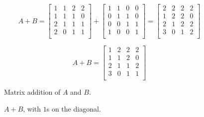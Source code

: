 \documentclass[../textbook.tex]{subfiles}
\begin{document}
\begin{figure}[h]
	\begin{center}
		\begin{minipage}[b]{0.55\textwidth}
			\centering
			$$A+B=\left[\begin{array}{cccc}
			1 & 1 & 2 & 2 \\
			1 & 1 & 1 & 0 \\
			2 & 1 & 1 & 1 \\
			2 & 0 & 1 & 1 \\
			\end{array}\right] + \left[\begin{array}{cccc}
			1 & 1 & 0 & 0 \\
			0 & 1 & 1 & 0 \\
			0 & 0 & 1 & 1 \\
			1 & 0 & 0 & 1 \\
			\end{array}\right] = \left[\begin{array}{cccc}
			2 & 2 & 2 & 2 \\
			1 & 2 & 2 & 0 \\
			2 & 1 & 2 & 2 \\
			3 & 0 & 1 & 2 \\
			\end{array}\right]$$
			\vspace*{0.5\baselineskip}
		\end{minipage}
		\hfill
		\begin{minipage}[b]{0.35\textwidth}
			$$A+B=\left[\begin{array}{cccc}
			1 & 2 & 2 & 2 \\
			1 & 1 & 2 & 0 \\
			2 & 1 & 1 & 2 \\
			3 & 0 & 1 & 1 \\
			\end{array}\right]$$
			\vspace*{0.5\baselineskip}
		\end{minipage}
	\end{center}
	\vspace*{-2\baselineskip}
	\begin{center}
		\begin{minipage}[t]{0.55\textwidth}
			\caption{Matrix addition of $A$ and $B$.}
			\label{fig:mtrx_add}
		\end{minipage}
		\hfill
		\begin{minipage}[t]{0.35\textwidth}
			\caption{$A+B$, with $1$s on the diagonal.}
			\label{fig:mtrx_replace}
		\end{minipage}
	\end{center}
	\vspace*{-2\baselineskip}
\end{figure}
\end{document}
